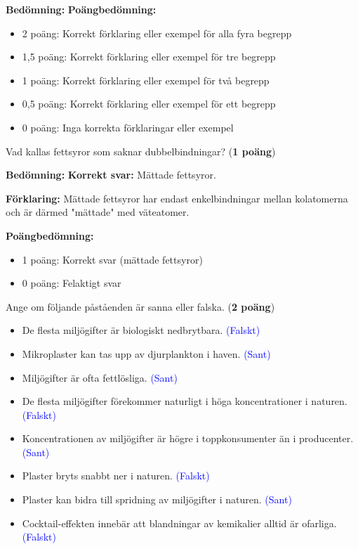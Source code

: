 \documentclass[12pt]{exam}
\newenvironment{answer}
  {\begin{framed}\color{blue}\textbf{Bedömning:} }
  {\end{framed}}
\begin{document}
\begin{questions}
\begin{answer}
\textbf{Poängbedömning:}
\begin{itemize}
  \item 2 poäng: Korrekt förklaring eller exempel för alla fyra begrepp
  \item 1,5 poäng: Korrekt förklaring eller exempel för tre begrepp
  \item 1 poäng: Korrekt förklaring eller exempel för två begrepp
  \item 0,5 poäng: Korrekt förklaring eller exempel för ett begrepp
  \item 0 poäng: Inga korrekta förklaringar eller exempel
\end{itemize}
\end{answer}
\vspace{5mm}

\question Vad kallas fettsyror som saknar dubbelbindningar? (\textbf{1 poäng})

\begin{answer}
\textbf{Korrekt svar:} Mättade fettsyror.

\textbf{Förklaring:} Mättade fettsyror har endast enkelbindningar mellan kolatomerna och är därmed "mättade" med väteatomer.

\textbf{Poängbedömning:}
\begin{itemize}
  \item 1 poäng: Korrekt svar (mättade fettsyror)
  \item 0 poäng: Felaktigt svar
\end{itemize}
\end{answer}
\break

\question Ange om följande påståenden är sanna eller falska. (\textbf{2 poäng})
\begin{itemize}
  \item De flesta miljögifter är biologiskt nedbrytbara. \textcolor{blue}{(Falskt)}
  \item Mikroplaster kan tas upp av djurplankton i haven. \textcolor{blue}{(Sant)}
  \item Miljögifter är ofta fettlösliga. \textcolor{blue}{(Sant)}
  \item De flesta miljögifter förekommer naturligt i höga koncentrationer i naturen. \textcolor{blue}{(Falskt)}
  \item Koncentrationen av miljögifter är högre i toppkonsumenter än i producenter. \textcolor{blue}{(Sant)}
  \item Plaster bryts snabbt ner i naturen. \textcolor{blue}{(Falskt)}
  \item Plaster kan bidra till spridning av miljögifter i naturen. \textcolor{blue}{(Sant)}
  \item Cocktail-effekten innebär att blandningar av kemikalier alltid är ofarliga. \textcolor{blue}{(Falskt)}
\end{itemize}
\vspace{5mm}


\end{questions}
\end{document}

